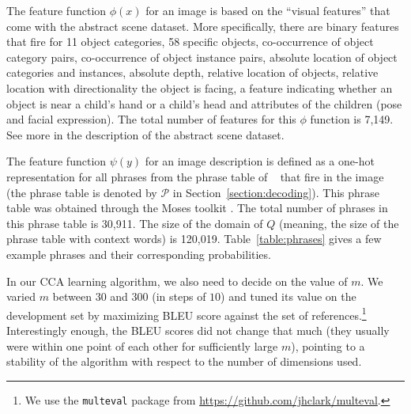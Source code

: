 \documentclass[letterpaper]{article}
\newcommand{\phrasetable}{\mathcal{P}}
\newcommand{\newcite}[1]{\citeauthor{#1}~\shortcite{#1}}
\begin{document}

The feature function $\phi(x)$ for an image is based on the ``visual features'' that come with the abstract scene dataset.
More specifically, there are binary features that fire for 11 object categories, 58 specific objects,
co-occurrence of object category pairs,
co-occurrence of object instance pairs, absolute location of object categories and instances, absolute depth, relative location of objects,
relative location with directionality the object is facing, a feature indicating whether an object is near a child's hand or a child's head and attributes
of the children (pose and facial expression). The total number of features for this $\phi$ function is 7,149. See more in the description of the abstract scene dataset. 

The feature function $\psi(y)$ for an image description is defined as a one-hot representation for all phrases from the phrase
table of \newcite{ortiz2015learning} that fire in the image (the phrase table is denoted by $\phrasetable$ in Section~\ref{section:decoding}). This phrase table was obtained through the Moses toolkit \cite{koehn2007moses}.
The total number of phrases in this phrase table is 30,911. The size of the domain of $Q$ (meaning, the size of the phrase table with context words) is 120,019.
Table~\ref{table:phrases} gives a few example phrases and their corresponding probabilities.

In our CCA learning algorithm, we also need to decide on the value of $m$. We varied $m$ between $30$ and $300$ (in steps of $10$) and tuned its value on
the development set by maximizing BLEU score against the set of references.\footnote{We use the {\tt multeval} package from \url{https://github.com/jhclark/multeval}.} Interestingly enough, the BLEU scores did not change that much (they usually were within one point of each other for sufficiently large $m$), pointing to a stability of the algorithm with respect to the number of dimensions used.
\end{document}
